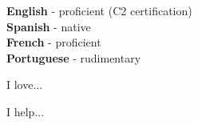 \documentclass[9pt]{developercv}
\begin{document}
    \begin{minipage}[t]{0.3\textwidth}
        \vspace{-\baselineskip} %


        \textbf{English} - proficient (C2 certification)\\
        \textbf{Spanish} - native\\
        \textbf{French} - proficient\\
        \textbf{Portuguese} - rudimentary
    \end{minipage}
    \hfill
    \begin{minipage}[t]{0.3\textwidth}
        \vspace{-\baselineskip} %


        I love... \lorem
    \end{minipage}
    \hfill
    \begin{minipage}[t]{0.3\textwidth}
        \vspace{-\baselineskip} %


        I help... \lorem
    \end{minipage}

\end{document}

